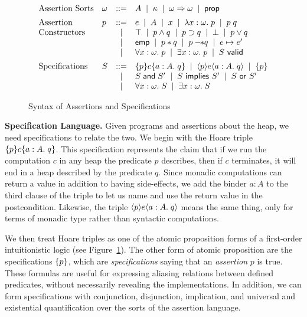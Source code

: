 \documentclass[preprint,natbib]{sigplanconf}
\begin{document}
\begin{figure}
\begin{displaymath}
\begin{array}{llcl}
\mbox{Assertion Sorts} & 
\omega & ::= & A \;\;|\;\; \kappa \;\;|\;\; \omega \Rightarrow \omega \;\;|\;\; \mbox{\textsf{{prop}}} 
\\[0.5em]
\mbox{Assertion} & 
p & ::= & e \;\;|\;\; A \;\;|\;\; x \;\;|\;\; \lambda x:\omega.\;p \;\;|\;\; p\;q \\
\mbox{Constructors}
& &  |  & \top \;\;|\;\; p \land q \;\;|\;\; p \supset q 
          \;\;|\;\; \bot \;\;|\;\; p \vee q \\
& &  |  &  \mathsf{emp} \;\;|\;\; p * q \;\;|\;\; p -\!\!* q \;\;|\;\; e \mapsto e' \\
& &  |  & \forall x:\omega.\; p \;\;|\;\; \exists x:\omega.\; p \;\;|\;\;
          {S}\mbox{\textsf{{ valid}}} 
\\[0.5em]
\mbox{Specifications} &
S & ::= & \{{p}\}{c}\{{a:A}.\;{q}\} \;\;|\;\; \langle{p}\rangle{e}\langle{a:A}.\;{q}\rangle \;\;|\;\; \{{p}\} \\
& &  |  & S \;\mbox{\textsf{{and}}}\; S' \;\;|\;\; S \mbox{\textsf{{ implies }}} S' \;\;|\;\; S \mbox{\textsf{{ or }}} S' \\
& &  |  & \forall x:\omega.\; S \;\;|\;\; \exists x:\omega.\;S 
\\
\end{array}
\end{displaymath}
\caption{Syntax of Assertions and Specifications}
\label{assert-syntax}
\end{figure}

\textbf{Specification Language.} Given programs and assertions about
the heap, we need specifications to relate the two. We begin with the
Hoare triple $\{{p}\}{c}\{{a:A}.\;{q}\}$. This specification represents the
claim that if we run the computation $c$ in any heap the predicate $p$
describes, then if $c$ terminates, it will end in a heap described by
the predicate $q$. Since monadic computations can return a value in
addition to having side-effects, we add the binder $a:A$ to the third
clause of the triple to let us name and use the return value in the
postcondition. Likewise, the triple $\langle{p}\rangle{e}\langle{a:A}.\;{q}\rangle$ means the
same thing, only for terms of monadic type rather than syntactic computations.

We then treat Hoare triples as one of the atomic proposition forms of
a first-order intuitionistic logic (see
Figure~\ref{assert-syntax}). The other form of atomic proposition are
the specifications $\{{p}\}$, which are \emph{specifications} saying that
an \emph{assertion} $p$ is true. These formulas are useful for
expressing aliasing relations between defined predicates, without
necessarily revealing the implementations. In addition, we can form
specifications with conjunction, disjunction, implication, and
universal and existential quantification over the sorts of the
assertion language. 
\end{document}
